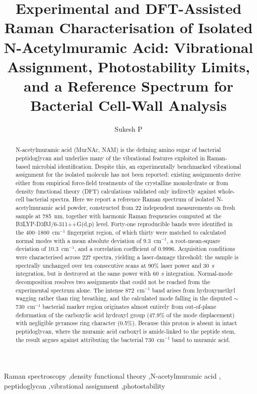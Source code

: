 \documentclass[preprint,12pt]{elsarticle}
\newcommand{\wn}{\ensuremath{\mathrm{cm}^{-1}}}
\begin{document}
\begin{frontmatter}

\title{Experimental and DFT-Assisted Raman Characterisation of Isolated
N-Acetylmuramic Acid: Vibrational Assignment, Photostability Limits, and a
Reference Spectrum for Bacterial Cell-Wall Analysis}

\author[iitj]{Sukesh P}


\begin{abstract}
N-acetylmuramic acid (MurNAc, NAM) is the defining amino sugar of bacterial
peptidoglycan and underlies many of the vibrational features exploited in
Raman-based microbial identification. Despite this, an experimentally
benchmarked vibrational assignment for the isolated molecule has not been
reported: existing assignments derive either from empirical force-field
treatments of the crystalline monohydrate or from density functional theory
(DFT) calculations validated only indirectly against whole-cell bacterial
spectra. Here we report a reference Raman spectrum of isolated N-acetylmuramic
acid powder, constructed from 22 independent measurements on fresh sample at
785~nm, together with harmonic Raman frequencies computed at the
B3LYP-D3BJ/6-311++G(d,p) level. Forty-one reproducible bands were identified in
the 400--1800~\wn{} fingerprint region, of which thirty were matched to
calculated normal modes with a mean absolute deviation of 9.3~\wn{}, a
root-mean-square deviation of 10.3~\wn{}, and a correlation coefficient of
0.9996. Acquisition conditions were characterised across 227 spectra, yielding a
laser-damage threshold: the sample is spectrally unchanged over ten consecutive
scans at 90\% laser power and 30~s integration, but is destroyed at the same
power with 60~s integration. Normal-mode decomposition resolves two assignments
that could not be reached from the experimental spectrum alone. The intense
872~\wn{} band arises from hydroxymethyl wagging rather than ring breathing, and
the calculated mode falling in the disputed $\sim$730~\wn{} bacterial marker
region originates almost entirely from out-of-plane deformation of the
carboxylic acid hydroxyl group (47.9\% of the mode displacement) with negligible
pyranose ring character (0.5\%). Because this proton is absent in intact
peptidoglycan, where the muramic acid carboxyl is amide-linked to the peptide
stem, the result argues against attributing the bacterial 730~\wn{} band to
muramic acid.
\end{abstract}

\begin{keyword}
Raman spectroscopy \sep density functional theory \sep N-acetylmuramic acid \sep
peptidoglycan \sep vibrational assignment \sep photostability
\end{keyword}

\end{frontmatter}
\linenumbers
\end{document}
